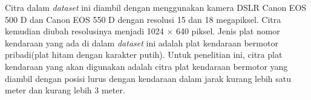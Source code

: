 \noindent Citra dalam \textit{dataset} ini diambil dengan menggunakan kamera DSLR Canon EOS 500 D dan Canon EOS 550 D dengan resolusi 15 dan 18 megapiksel. Citra kemudian diubah resolusinya menjadi 1024 $\times$ 640 piksel. Jenis plat nomor kendaraan yang ada di dalam \textit{dataset} ini adalah plat kendaraan bermotor pribadi(plat hitam dengan karakter putih). Untuk penelitian ini, citra plat kendaraan yang akan digunakan adalah citra plat kendaraan bermotor yang diambil dengan posisi lurus dengan kendaraan dalam jarak kurang lebih satu meter dan kurang lebih 3 meter.




